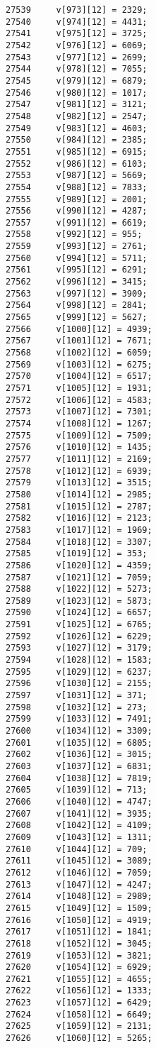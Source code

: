 \begin{Code}
\begin{verbatim}
27539     v[973][12] = 2329;
27540     v[974][12] = 4431;
27541     v[975][12] = 3725;
27542     v[976][12] = 6069;
27543     v[977][12] = 2699;
27544     v[978][12] = 7055;
27545     v[979][12] = 6879;
27546     v[980][12] = 1017;
27547     v[981][12] = 3121;
27548     v[982][12] = 2547;
27549     v[983][12] = 4603;
27550     v[984][12] = 2385;
27551     v[985][12] = 6915;
27552     v[986][12] = 6103;
27553     v[987][12] = 5669;
27554     v[988][12] = 7833;
27555     v[989][12] = 2001;
27556     v[990][12] = 4287;
27557     v[991][12] = 6619;
27558     v[992][12] = 955;
27559     v[993][12] = 2761;
27560     v[994][12] = 5711;
27561     v[995][12] = 6291;
27562     v[996][12] = 3415;
27563     v[997][12] = 3909;
27564     v[998][12] = 2841;
27565     v[999][12] = 5627;
27566     v[1000][12] = 4939;
27567     v[1001][12] = 7671;
27568     v[1002][12] = 6059;
27569     v[1003][12] = 6275;
27570     v[1004][12] = 6517;
27571     v[1005][12] = 1931;
27572     v[1006][12] = 4583;
27573     v[1007][12] = 7301;
27574     v[1008][12] = 1267;
27575     v[1009][12] = 7509;
27576     v[1010][12] = 1435;
27577     v[1011][12] = 2169;
27578     v[1012][12] = 6939;
27579     v[1013][12] = 3515;
27580     v[1014][12] = 2985;
27581     v[1015][12] = 2787;
27582     v[1016][12] = 2123;
27583     v[1017][12] = 1969;
27584     v[1018][12] = 3307;
27585     v[1019][12] = 353;
27586     v[1020][12] = 4359;
27587     v[1021][12] = 7059;
27588     v[1022][12] = 5273;
27589     v[1023][12] = 5873;
27590     v[1024][12] = 6657;
27591     v[1025][12] = 6765;
27592     v[1026][12] = 6229;
27593     v[1027][12] = 3179;
27594     v[1028][12] = 1583;
27595     v[1029][12] = 6237;
27596     v[1030][12] = 2155;
27597     v[1031][12] = 371;
27598     v[1032][12] = 273;
27599     v[1033][12] = 7491;
27600     v[1034][12] = 3309;
27601     v[1035][12] = 6805;
27602     v[1036][12] = 3015;
27603     v[1037][12] = 6831;
27604     v[1038][12] = 7819;
27605     v[1039][12] = 713;
27606     v[1040][12] = 4747;
27607     v[1041][12] = 3935;
27608     v[1042][12] = 4109;
27609     v[1043][12] = 1311;
27610     v[1044][12] = 709;
27611     v[1045][12] = 3089;
27612     v[1046][12] = 7059;
27613     v[1047][12] = 4247;
27614     v[1048][12] = 2989;
27615     v[1049][12] = 1509;
27616     v[1050][12] = 4919;
27617     v[1051][12] = 1841;
27618     v[1052][12] = 3045;
27619     v[1053][12] = 3821;
27620     v[1054][12] = 6929;
27621     v[1055][12] = 4655;
27622     v[1056][12] = 1333;
27623     v[1057][12] = 6429;
27624     v[1058][12] = 6649;
27625     v[1059][12] = 2131;
27626     v[1060][12] = 5265;

\end{verbatim}
\end{Code}

